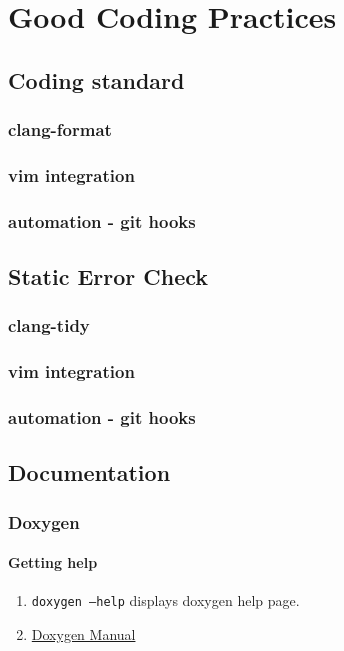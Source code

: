 \chapter{Good Coding Practices}


\section{Coding standard}
\subsection{clang-format}
\subsection{vim integration}
\subsection{automation - git hooks}


\section{Static Error Check}
\subsection{clang-tidy}
\subsection{vim integration}
\subsection{automation - git hooks}

\section{Documentation}
\subsection{Doxygen}

\subsubsection{Getting help}

\begin{enumerate}
  \item \texttt{doxygen --help} displays doxygen help page.
  \item \href{https://doxygen.nl/manual/index.html}{Doxygen Manual}
\end{enumerate}

